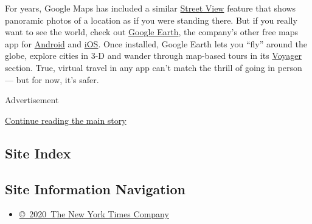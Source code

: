 For years, Google Maps has included a similar
\href{https://support.google.com/maps/answer/3093484?co=GENIE.Platform\%3DAndroid\&hl=en\&oco=1}{Street
View} feature that shows panoramic photos of a location as if you were
standing there. But if you really want to see the world, check out
\href{https://www.google.com/earth/versions/\#earth-for-mobile}{Google
Earth}, the company's other free maps app for
\href{https://play.google.com/store/apps/details?id=com.google.earth\&hl=en_US}{Android}
and \href{https://apps.apple.com/us/app/google-earth/id293622097}{iOS}.
Once installed, Google Earth lets you ``fly'' around the globe, explore
cities in 3-D and wander through map-based tours in its
\href{https://support.google.com/earth/answer/7365064?hl=en\&ref_topic=7364880\&co=GENIE.Platform\%3DAndroid\&oco=1}{Voyager}
section. True, virtual travel in any app can't match the thrill of going
in person --- but for now, it's safer.

Advertisement

\protect\hyperlink{after-bottom}{Continue reading the main story}

\hypertarget{site-index}{%
\subsection{Site Index}\label{site-index}}

\hypertarget{site-information-navigation}{%
\subsection{Site Information
Navigation}\label{site-information-navigation}}

\begin{itemize}
\tightlist
\item
  \href{https://help.nytimes3xbfgragh.onion/hc/en-us/articles/115014792127-Copyright-notice}{©~2020~The
  New York Times Company}
\end{itemize}

